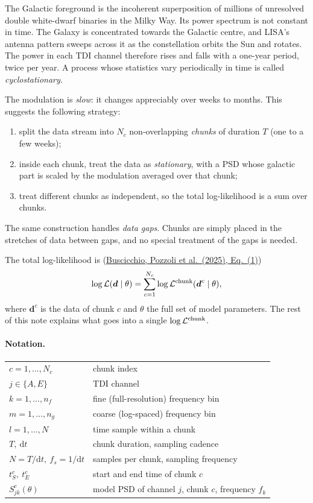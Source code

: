 \documentclass[11pt,a4paper]{article}
\newcommand{\urlPone}{https://arxiv.org/pdf/2511.03604}
\newcommand{\PoneEq}[1]{\href{\urlPone}{Buscicchio, Pozzoli et al.~(2025), Eq.~(#1)}}
\newcommand{\dd}{\mathrm{d}}
\begin{document}
The Galactic foreground is the incoherent superposition of millions of unresolved
double white-dwarf binaries in the Milky Way. Its power spectrum is not constant in
time. The Galaxy is concentrated towards the Galactic centre, and LISA's antenna
pattern sweeps across it as the constellation orbits the Sun and rotates. The power
in each TDI channel therefore rises and falls with a one-year period, twice per year.
A process whose statistics vary periodically in time is called
\emph{cyclostationary}.

The modulation is \emph{slow}: it changes appreciably over weeks to months. This
suggests the following strategy:
\begin{enumerate}
  \item split the data stream into $N_c$ non-overlapping \emph{chunks} of duration
        $T$ (one to a few weeks);
  \item inside each chunk, treat the data as \emph{stationary}, with a PSD whose
        galactic part is scaled by the modulation averaged over that chunk;
  \item treat different chunks as independent, so the total log-likelihood is a sum
        over chunks.
\end{enumerate}
The same construction handles \emph{data gaps}. Chunks are simply placed in the
stretches of data between gaps, and no special treatment of the gaps is needed.

The total log-likelihood is (\PoneEq{1})
\begin{equation}
  \log\mathcal{L}(\boldsymbol{d}\mid\theta)
  = \sum_{c=1}^{N_c} \log\mathcal{L}^{\rm chunk}(\boldsymbol{d}^c\mid\theta),
  \label{eq:total}
\end{equation}
where $\boldsymbol{d}^c$ is the data of chunk $c$ and $\theta$ the full set of model
parameters. The rest of this note explains what goes into a single
$\log\mathcal{L}^{\rm chunk}$.

\paragraph{Notation.}
\begin{center}
\begin{tabular}{@{}ll@{}}
\toprule
$c = 1,\dots,N_c$ & chunk index \\
$j\in\{A,E\}$ & TDI channel \\
$k = 1,\dots,n_f$ & fine (full-resolution) frequency bin \\
$m = 1,\dots,n_g$ & coarse (log-spaced) frequency bin \\
$l = 1,\dots,N$ & time sample within a chunk \\
$T,\ \dd t$ & chunk duration, sampling cadence \\
$N = T/\dd t,\ f_s = 1/\dd t$ & samples per chunk, sampling frequency \\
$t^c_S,\ t^c_E$ & start and end time of chunk $c$ \\
$S^c_{jk}(\theta)$ & model PSD of channel $j$, chunk $c$, frequency $f_k$ \\
\bottomrule
\end{tabular}
\end{center}
\end{document}
